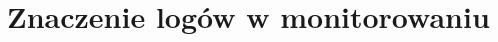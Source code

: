 \chapter[Znaczenie logów]{Znaczenie logów w monitorowaniu}
\label{chapter:logs}

\clearpage 
\clearpage 
\clearpage 
\clearpage 
\clearpage 
\clearpage 